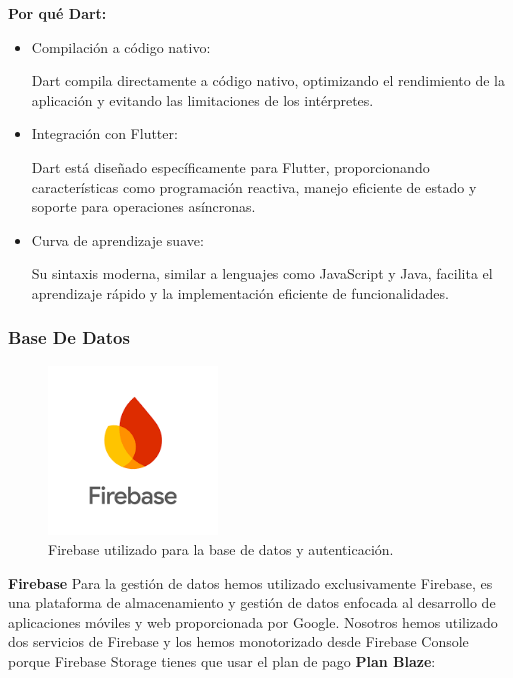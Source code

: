 \documentclass{article}
\begin{document}
\begin{flushleft}
\begin{itemize}
\end{itemize}

\textbf{Por qué Dart:}

\begin{itemize}
    \item Compilación a código nativo:

Dart compila directamente a código nativo, optimizando el rendimiento de la aplicación y evitando las limitaciones de los intérpretes.
\item Integración con Flutter:

Dart está diseñado específicamente para Flutter, proporcionando características como programación reactiva, manejo eficiente de estado y soporte para operaciones asíncronas.
\item Curva de aprendizaje suave:

Su sintaxis moderna, similar a lenguajes como JavaScript y Java, facilita el aprendizaje rápido y la implementación eficiente de funcionalidades.
\end{itemize}


        \subsubsection{Base De Datos}

\begin{figure}[H]
    \centering
    \includegraphics[width=0.4\textwidth]{TFG/img/firebase.png}
    \caption{Firebase utilizado para la base de datos y autenticación.}
    \label{fig:firebase}
\end{figure}

 \textbf{Firebase} 
   Para la gestión de datos hemos utilizado exclusivamente Firebase, es una plataforma de almacenamiento y gestión de datos enfocada al desarrollo de aplicaciones móviles y web proporcionada por Google. Nosotros hemos utilizado dos servicios de Firebase y los hemos monotorizado desde Firebase Console porque Firebase Storage tienes que usar el plan de pago \textbf{Plan Blaze}:


\end{flushleft}
\end{document}
